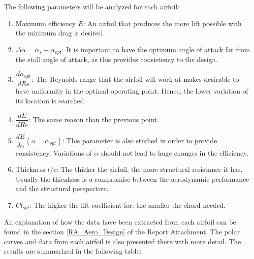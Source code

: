 \documentclass[../TFG_Report.tex]{subfiles}
\begin{document}
\FloatBarrier

The following parameters will be analyzed for each airfoil:



\begin{enumerate}
	\item Maximum efficiency $E$: An airfoil that produces the more lift possible with the minimum drag is desired. 
	\item $\Delta \alpha=\alpha_{s}-\alpha_{opt}$: It is important to have the optimum angle of attack far from the stall angle of attack, as this provides consistency to the design. 
	\item $\dfrac{d\alpha_{opt}}{dRe}$: The Reynolds range that the airfoil will work at makes desirable to have uniformity in the optimal operating point. Hence, the lower variation of its location is searched. 
	\item $\dfrac{dE}{dRe}$: The same reason than the previous point. 
	\item $\dfrac{dE}{d \alpha} (\alpha=\alpha_{opt})$: This parameter is also studied in order to provide consistency. Variations of $\alpha$ should not lead to huge changes in the efficiency. 
	\item Thickness $t/c$: The thicker the airfoil, the more structural resistance it has. Usually the thicnkess is a compromise between the aerodynamic performance and the structural perspective. 
	\item $Cl_{opt}$: The higher the lift coefficient for, the smaller the chord needed.
	
\end{enumerate}

An explanation of how the data have been extracted from each airfoil can be found in the section \ref{RA_Aero_Design} of the Report Attachment. The polar curves and data from each airfoil is also presented there with more detail. The results are summarized in the following table: 
\end{document}
